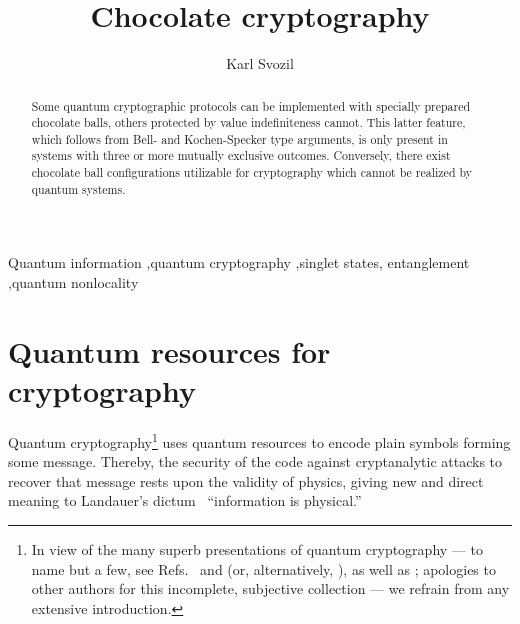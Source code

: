 \documentclass[12pt]{elsarticle}%
\begin{document}
\begin{frontmatter}


\title{Chocolate cryptography}

\author{Karl Svozil}
\address{Institute for Theoretical Physics, University of Technology Vienna,\\ Wiedner Hauptstrasse 8-10/136, 1040 Vienna,  Austria}

\begin{abstract}
Some quantum cryptographic protocols can be implemented with specially prepared chocolate balls, others protected by value indefiniteness cannot. This latter feature, which follows from Bell- and Kochen-Specker type arguments, is only present in systems with three or more mutually exclusive outcomes. Conversely, there exist chocolate ball configurations utilizable for cryptography which cannot be realized by quantum systems.
\end{abstract}


\begin{keyword}
Quantum information \sep quantum cryptography \sep singlet states, entanglement \sep quantum nonlocality
\end{keyword}

\end{frontmatter}


\section{Quantum resources for cryptography}

Quantum cryptography\footnote{
In view of the many superb presentations of quantum cryptography
--- to name but a few, see Refs.~\cite{gisin-qc-rmp,arXiv:0802.4155}  and
\cite[Chapter~6]{mermin-04} (or, alternatively, \cite[Section 6.2]{mermin-07}),
as well as
\cite[Section~12.6]{nielsen-book};
apologies to other authors for this incomplete, subjective collection
---
we refrain from any extensive introduction.
}
uses quantum resources to encode plain symbols forming some message.
Thereby, the security of the code against cryptanalytic attacks to recover
that message rests upon the validity of physics, giving new and direct meaning to
Landauer's dictum~\cite{landauer} ``information is physical.''
\end{document}
